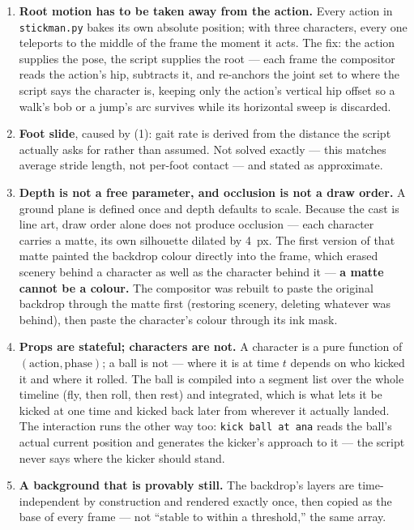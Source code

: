 \documentclass[11pt]{article}
\begin{document}
\begin{enumerate}
\item \textbf{Root motion has to be taken away from the action.} Every
  action in \texttt{stickman.py} bakes its own absolute position; with
  three characters, every one teleports to the middle of the frame the
  moment it acts. The fix: the action supplies the pose, the script
  supplies the root --- each frame the compositor reads the action's hip,
  subtracts it, and re-anchors the joint set to where the script says the
  character is, keeping only the action's vertical hip offset so a walk's
  bob or a jump's arc survives while its horizontal sweep is discarded.
\item \textbf{Foot slide}, caused by (1): gait rate is derived from the
  distance the script actually asks for rather than assumed. Not solved
  exactly --- this matches average stride length, not per-foot contact ---
  and stated as approximate.
\item \textbf{Depth is not a free parameter, and occlusion is not a draw
  order.} A ground plane is defined once and depth defaults to scale.
  Because the cast is line art, draw order alone does not produce
  occlusion --- each character carries a matte, its own silhouette
  dilated by 4~px. The first version of that matte painted the backdrop
  colour directly into the frame, which erased scenery behind a character
  as well as the character behind it --- \textbf{a matte cannot be a
  colour.} The compositor was rebuilt to paste the original backdrop
  through the matte first (restoring scenery, deleting whatever was
  behind), then paste the character's colour through its ink mask.
\item \textbf{Props are stateful; characters are not.} A character is a
  pure function of $(\text{action}, \text{phase})$; a ball is not ---
  where it is at time $t$ depends on who kicked it and where it rolled.
  The ball is compiled into a segment list over the whole timeline (fly,
  then roll, then rest) and integrated, which is what lets it be kicked
  at one time and kicked back later from wherever it actually landed. The
  interaction runs the other way too: \texttt{kick ball at ana} reads the
  ball's actual current position and generates the kicker's approach to
  it --- the script never says where the kicker should stand.
\item \textbf{A background that is provably still.} The backdrop's
  layers are time-independent by construction and rendered exactly once,
  then copied as the base of every frame --- not ``stable to within a
  threshold,'' the same array.
\end{enumerate}
\end{document}
